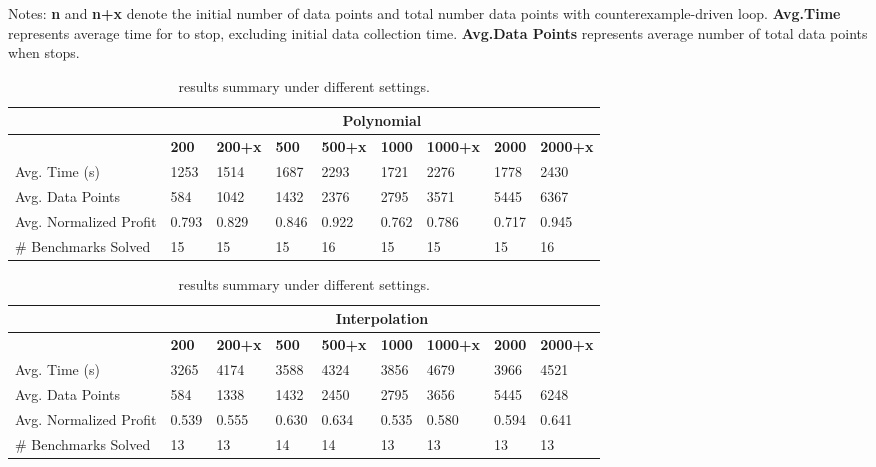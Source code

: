 \begin{table}[h!]
    \caption{{\name} results summary under different settings.}
    \flushleft
    {\raggedright Notes: 
    \textbf{n} and \textbf{n+x} denote the initial number of data points and total number
    data points with counterexample-driven loop.
    \textbf{Avg.Time} represents average time for {\name} to stop, excluding initial data collection time.
    \textbf{Avg.Data Points} represents average number of total data points when {\name} stops.
    \par}

        
    \centering
    \setlength{\tabcolsep}{4pt}
\begin{tabular}{|l|llllllll|}
    \hline
    & \multicolumn{8}{c|}{\textbf{Polynomial} }      \\ \hline
    & \textbf{200}  & \textbf{200+x} & \textbf{500}  & \textbf{500+x} & \textbf{1000} & \textbf{1000+x} & \textbf{2000} & \textbf{2000+x}  \\ \hline
Avg. Time (s)           & 1253      & 1514      & 1687      & 2293  & 1721  & 2276   & 1778  & 2430   \\
Avg. Data Points        & 584       & 1042      & 1432      & 2376  & 2795 & 3571   & 5445 & 6367   \\
Avg. Normalized Profit  & 0.793     & 0.829     & 0.846     & 0.922  & 0.762 & 0.786  & 0.717 & 0.945    \\ 
\# Benchmarks Solved    & 15        & 15        & 15   & 16    & 15   & 15     & 15   & 16    \\ \hline
\end{tabular}

\begin{tabular}{|l|llllllll|}
    \hline
    & \multicolumn{8}{c|}{\textbf{Interpolation}} \\ \hline
    &  \textbf{200}  & \textbf{200+x} & \textbf{500}  & \textbf{500+x} & \textbf{1000} & \textbf{1000+x} & \textbf{2000} & \textbf{2000+x}  \\ \hline
Avg. Time (s)            & 3265 & 4174  & 3588 & 4324  & 3856 & 4679   & 3966 & 4521   \\
Avg. Data Points         & 584  & 1338  & 1432 & 2450  & 2795 & 3656   & 5445 & 6248   \\
Avg. Normalized Profit   & 0.539 & 0.555  & 0.630 & 0.634  & 0.535 & 0.580   & 0.594 & 0.641    \\ 
\# Benchmarks Solved     & 13   & 13    & 14   & 14    & 13   & 13     & 13   & 13  \\ \hline
\end{tabular}

\label{tab:RQ3Summary}
\vspace{-5mm}
\end{table}
